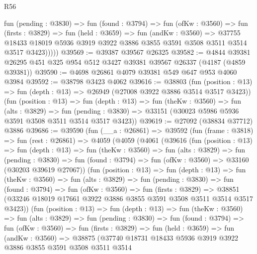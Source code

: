 \begin{lexlean}{R56}
\begin{coremodule}
            fun (pending : @3830) =>
            fun (found : @3794) =>
            fun (ofKw : @3560) =>
            fun (firsts : @3829) =>
            fun (held : @3659) =>
            fun (andKw : @3560) =>
            @37755
              @18433
              @18019
              @5936
              @3919
              @3922
              @3886
              @3855
              @3591
              @3508
              @3511
              @3514
              @3517
              @3423)))))
@39569 := @39387 @39567 @26325
@39582 := @4844 @39381 @26295 @451 @325 @954 @512 @3427 @39381 @39567 @26337 (@4187 (@4859 @39381))
@39590 := @4698 @26861 @4079 @39381 @549 @647 @953 @4060 @3984
@39592 := @38798 @3423 @4062
@39616 := @38803
    (fun (position : @13) => fun (depth : @13) => @26949 (@27008 @3922 @3886 @3514 @3517 @3423))
    (fun (position : @13) =>
    fun (depth : @13) =>
    fun (theKw : @3560) =>
    fun (alts : @3829) =>
    fun (pending : @3830) => @33151 (@30023 @5986 @5936 @3591 @3508 @3511 @3514 @3517 @3423))
@39619 := @27092 (@38834 @37712) @3886
@39686 := @39590
    (fun (__a : @26861) =>
    @39592
      (fun (frame : @3818) =>
      fun (rest : @26861) =>
      @4059
        (@4059
          (@4061
            (@39616
              (fun (position : @13) =>
              fun (depth : @13) =>
              fun (theKw : @3560) =>
              fun (alts : @3829) =>
              fun (pending : @3830) =>
              fun (found : @3794) => fun (ofKw : @3560) => @33160 (@30203 @39619 @27067))
              (fun (position : @13) =>
              fun (depth : @13) =>
              fun (theKw : @3560) =>
              fun (alts : @3829) =>
              fun (pending : @3830) =>
              fun (found : @3794) =>
              fun (ofKw : @3560) =>
              fun (firsts : @3829) =>
              @38851 (@33246 @18019 @17661 @3922 @3886 @3855 @3591 @3508 @3511 @3514 @3517 @3423))
              (fun (position : @13) =>
              fun (depth : @13) =>
              fun (theKw : @3560) =>
              fun (alts : @3829) =>
              fun (pending : @3830) =>
              fun (found : @3794) =>
              fun (ofKw : @3560) =>
              fun (firsts : @3829) =>
              fun (held : @3659) =>
              fun (andKw : @3560) =>
              @38875
                (@37740
                  @18731
                  @18433
                  @5936
                  @3919
                  @3922
                  @3886
                  @3855
                  @3591
                  @3508
                  @3511
                  @3514

\end{coremodule}
\end{lexlean}
